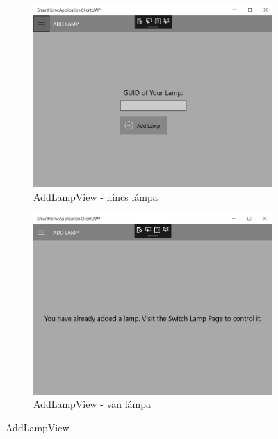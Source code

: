 \documentclass[a4paper,12pt]{report}
\begin{document}
\begin{figure}[H]
    \centering
    \begin{subfigure}[b]{0.4\linewidth}
        \includegraphics[width=\linewidth]{images/addlampview.jpg}
        \caption{AddLampView - nincs lámpa}
    \end{subfigure}
    \begin{subfigure}[b]{0.4\linewidth}
        \includegraphics[width=\linewidth]{images/alreadyhaslamp.jpg}
        \caption{AddLampView - van lámpa}
    \end{subfigure}
    \caption{AddLampView}
    \label{fig:AddLamp}
\end{figure}
\end{document}
